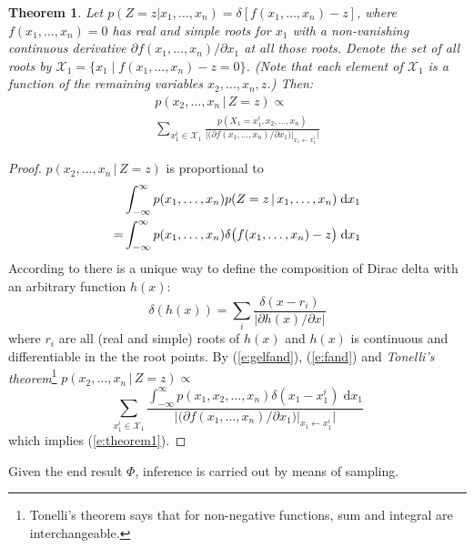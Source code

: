 \documentclass{article}
\newtheorem{theorem}{Theorem}
\newcommand{\pr}{p}
\newcommand{\dd}{\;\mathrm{d}} %
\begin{document}
\begin{theorem} 
\label{theorem1}
Let {\footnotesize $\pr(Z\!=\!z | x_1, \ldots, x_n) = \delta[f(x_1, \ldots, x_n)-z]$}, 
where $f(x_1, \ldots, x_n) = 0$ has real and simple roots for $x_1$ with a non-vanishing continuous derivative
$\partial f(x_1, \ldots, x_n) / \partial x_1$ at all those roots.
Denote the set of all roots by 
 $ \mathcal{X}_1 = \{ x_1 \; | \; f(x_1, \ldots, x_n) - z = 0 \} $. 
(Note that each element of $ \mathcal{X}_1 $
 is a function of the remaining variables $ x_2,\dots,x_n,z $.)
 Then:
\begin{multline}
\label{e:theorem1}
p(x_2, \ldots, x_n \,|\, Z=z) \propto \\
\sum_{x_1^i \in \mathcal{X}_1} 
\frac{p(X_1=x_1^i, x_2, \ldots, x_n)}
{\Big|\big(\partial f(x_1, \ldots, x_n) / \partial x_1 \big)|_{x_1 \leftarrow x_1^i} \Big|}
\end{multline}
\end{theorem}
\begin{proof}
$p(x_2, \ldots, x_n \,|\, Z=z)$ is proportional to
\begin{align}
%
%
%
&\int_{-\infty}^{\infty}p(x_1, \ldots, x_n)p(Z=z \,|\, x_1, \ldots, x_n) \dd x_1 \notag\\
%
=&\int_{-\infty}^{\infty}p(x_1, \ldots, x_n)
\delta \big( f(x_1, \ldots, x_n) - z \big) \dd x_1 
\label{e:fand}
\end{align}
According to \cite{gel1964generalized}
there is a unique way to define the composition of Dirac delta with 
an arbitrary function $h(x)$:
\begin{equation}
\label{e:gelfand}
\delta(h(x)) = \sum_{i} \frac{\delta(x - r_i)}{|\partial h(x)/\partial x|}
\end{equation}
where $r_i$ are all (real and simple) roots of $h(x)$ and $h(x)$ is continuous and differentiable in the the root points. By (\ref{e:gelfand}), (\ref{e:fand}) and 
\emph{Tonelli's theorem}\footnote{Tonelli's theorem says that for non-negative functions, sum and integral are interchangeable.} 
$\pr(x_2, \ldots, x_n \,|\, Z = z) \propto$
\begin{equation*}
\sum_{x_1^i \in \mathcal{X}_1} 
\frac{\int_{-\infty}^{\infty} p(x_1, x_2, \ldots, x_n)  \delta(x_1 - x_1^i) \dd x_1}
{\Big|\big(\partial f(x_1, \ldots, x_n) / \partial x_1 \big)|_{x_1 \leftarrow x_1^i} \Big|}
\end{equation*}
which implies (\ref{e:theorem1}).
\end{proof}
%
Given the end result ${\Phi}$, inference is carried out by means of sampling.
\end{document}
